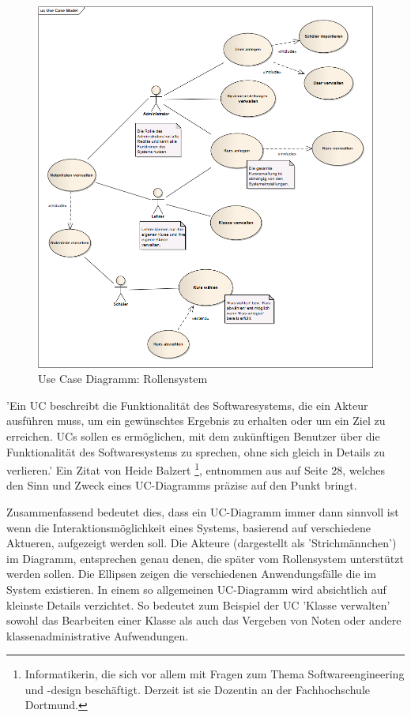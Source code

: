\documentclass[12pt, twoside, a4paper, ngerman]{article}
\newcommand{\iz}[2]{#1 {\renewcommand{\baselinestretch}{1}\footnote{#2}}} %
\renewcommand{\baselinestretch}{1.5}
\begin{document}
\begin{figure}[H]
 \begin{center}
   \includegraphics[scale=0.5]{img/UseCaseModel_kuwasys20.png}
 \end{center}
 \caption[\textbf{Use Case Diagram: Rollensystem}]{Use Case Diagramm: Rollensystem}
 \label{fig:UML_UC_kuwasys20}
\end{figure}

'Ein \ac{UC} beschreibt die Funktionalität des Softwaresystems, die ein Akteur ausführen muss, um ein gewünschtes Ergebnis zu erhalten oder um ein Ziel zu erreichen. \ac{UC}s sollen es ermöglichen, mit dem zukünftigen Benutzer über die Funktionalität des Softwaresystems zu sprechen, ohne sich gleich in Details zu verlieren.' Ein Zitat von \iz{Heide Balzert}{Informatikerin, die sich vor allem mit Fragen zum Thema Softwareengineering und -design beschäftigt. Derzeit ist sie Dozentin an der Fachhochschule Dortmund.}, entnommen aus \cite{BalzertH-UML2} auf Seite 28, welches den Sinn und Zweck eines \ac{UC-Diagramm}s präzise auf den Punkt bringt.

Zusammenfassend bedeutet dies, dass ein \ac{UC-Diagramm} immer dann sinnvoll ist wenn die Interaktionsmöglichkeit eines Systems, basierend auf verschiedene Aktueren, aufgezeigt werden soll. Die Akteure (dargestellt als 'Strichmännchen') im Diagramm, entsprechen genau denen, die später vom Rollensystem unterstützt werden sollen. Die Ellipsen zeigen die verschiedenen Anwendungsfälle die im System existieren. In einem so allgemeinen \ac{UC-Diagramm} wird absichtlich auf kleinste Details verzichtet. So bedeutet zum Beispiel der \ac{UC} 'Klasse verwalten' sowohl das Bearbeiten einer Klasse als auch das Vergeben von Noten oder andere klassenadministrative Aufwendungen.
\end{document}
